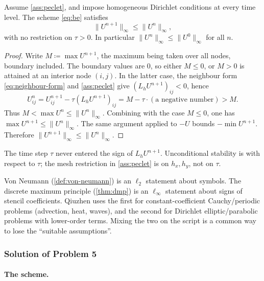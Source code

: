 \documentclass[11pt,a4paper]{article}
\begin{document}
\begin{theorem}
\label{thm:be-stable}
Assume \cref{ass:peclet}, and impose homogeneous Dirichlet conditions at every time level. The scheme \eqref{eq:be} satisfies
\[
\|U^{n+1}\|_\infty
\le
\|U^n\|_\infty,
\]
with no restriction on \(\tau>0\). In particular \(\|U^n\|_\infty\le\|U^0\|_\infty\) for all \(n\).
\end{theorem}

\begin{proof}
Write \(M\coloneqq\max U^{n+1}\), the maximum being taken over all nodes, boundary included. The boundary values are \(0\), so either \(M\le 0\), or \(M>0\) is attained at an interior node \((i,j)\). In the latter case, the neighbour form \eqref{eq:neighbour-form} and \cref{ass:peclet} give \((L_h U^{n+1})_{ij}<0\), hence
\[
U_{ij}^n
=
U_{ij}^{n+1}-\tau(L_h U^{n+1})_{ij}
=
M-\tau\cdot(\text{a negative number})
>
M.
\]
Thus \(M<\max U^n\le\|U^n\|_\infty\). Combining with the case \(M\le 0\), one has \(\max U^{n+1}\le\|U^n\|_\infty\). The same argument applied to \(-U\) bounds \(-\min U^{n+1}\). Therefore \(\|U^{n+1}\|_\infty\le\|U^n\|_\infty\).
\end{proof}

The time step \(\tau\) never entered the sign of \(L_h U^{n+1}\). Unconditional stability is with respect to \(\tau\); the mesh restriction in \cref{ass:peclet} is on \(h_x,h_y\), not on \(\tau\).

\begin{examnote}
\label{exnote:two-languages}
Von Neumann (\cref{def:von-neumann}) is an \(\ell_2\) statement about symbols. The discrete maximum principle (\cref{thm:dmp}) is an \(\ell_\infty\) statement about signs of stencil coefficients. Qiuzhen uses the first for constant-coefficient Cauchy/periodic problems (advection, heat, waves), and the second for Dirichlet elliptic/parabolic problems with lower-order terms. Mixing the two on the script is a common way to lose the ``suitable assumptions''.
\end{examnote}

\subsubsection{Solution of Problem 5}

\paragraph{The scheme.}
\end{document}
